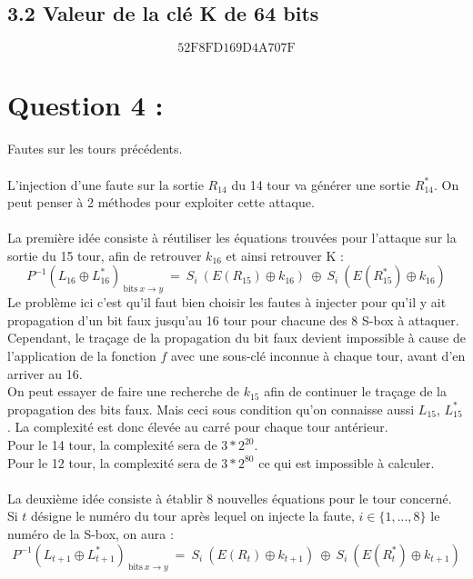 		\subsection*{3.2 Valeur de la clé K de 64 bits}
		\[ \textrm{52F8FD169D4A707F} \]
		
	\section*{Question 4 :}
	
		\noindent Fautes sur les tours précédents.
		
		\paragraph{} L'injection d'une faute sur la sortie $R_{14}$ du 14 tour va générer une sortie $R_{14}^{*}$. On peut penser à 2 méthodes pour exploiter cette attaque.
		
		\paragraph{} La première idée consiste à réutiliser les équations trouvées pour l'attaque sur la sortie du 15 tour, afin de retrouver $k_{16}$ et ainsi retrouver K :
		\[
			P^{-1}(L_{16} \oplus L_{16}^{*})_{\ \textrm{bits}\ x \to y}\ = \ S_{i}\ (E(R_{15}) \oplus k_{16})\ \oplus \ S_{i}\ (E(R_{15}^{*}) \oplus k_{16})
		\]
		Le problème ici c'est qu'il faut bien choisir les fautes à injecter pour qu'il y ait propagation d'un bit faux jusqu'au 16 tour pour chacune des 8 S-box à attaquer. Cependant, le traçage de la propagation du bit faux devient impossible à cause de l'application de la fonction $f$ avec une sous-clé inconnue à chaque tour, avant d'en arriver au 16.\\
		On peut essayer de faire une recherche de $k_{15}$ afin de continuer le traçage de la propagation des bits faux. Mais ceci sous condition qu'on connaisse aussi $L_{15}$, $L_{15}^{*}$. La complexité est donc élevée au carré pour chaque tour antérieur.\\
		Pour le 14 tour, la complexité sera de $3 * 2^{20}$.\\
		Pour le 12 tour, la complexité sera de $3 * 2^{80}$ ce qui est impossible à calculer.
		
		\paragraph{} La deuxième idée consiste à établir 8 nouvelles équations pour le tour concerné. Si $t$ désigne le numéro du tour après lequel on injecte la faute, $i \in \{1, ...,8\}$ le numéro de la S-box, on aura :
		\[
			P^{-1}(L_{t+1} \oplus L_{t+1}^{*})_{\ \textrm{bits}\ x \to y}\ = \ S_{i}\ (E(R_{t}) \oplus k_{t+1})\ \oplus \ S_{i}\ (E(R_{t}^{*}) \oplus k_{t+1})
		\]
		
